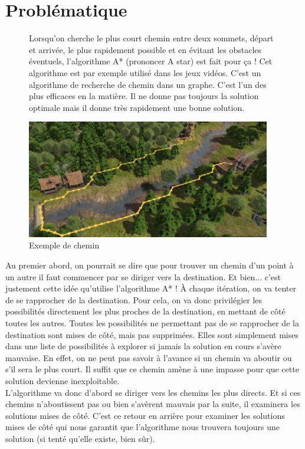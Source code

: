 

\section{Problématique}




\begin{figure}[!h]
\begin{minipage}{0.6\textwidth}
Lorsqu'on cherche le plus court chemin entre deux sommets, départ et arrivée, le plus rapidement possible et en évitant les obstacles éventuels, l'algorithme A* (prononcer A star) est fait pour ça ! Cet algorithme est par exemple utilisé dans les jeux vidéos.
C'est un algorithme de recherche de chemin dans un graphe. C'est l'un des plus efficaces en la matière. Il ne donne pas toujours la solution optimale mais il donne très rapidement une bonne solution.\\
\end{minipage}
\begin{minipage}{0.4\textwidth}
\begin{center}
\includegraphics[width=0.95\textwidth]{images/jeuVideo.jpg}
\caption{Exemple de chemin}
\end{center}
\end{minipage}
\end{figure}


Au premier abord, on pourrait se dire que pour trouver un chemin d'un point à un autre il faut commencer par se diriger vers la destination. Et bien... c'est justement cette idée qu'utilise l'algorithme A* ! À chaque itération, on va tenter de se rapprocher de la destination. Pour cela, on va donc privilégier les possibilités directement les plus proches de la destination, en mettant de côté toutes les autres. Toutes les possibilités ne permettant pas de se rapprocher de la destination sont mises de côté, mais pas supprimées. Elles
sont simplement mises dans une liste de possibilités à explorer si jamais la solution en cours s'avère mauvaise.
En effet, on ne peut pas savoir à l'avance si un chemin va aboutir ou s'il sera le plus court. Il suffit que ce chemin amène à une impasse pour que cette solution devienne inexploitable.\\
L'algorithme va donc d'abord se diriger vers les chemins les plus directs. Et si ces chemins n'aboutissent pas ou bien s'avèrent mauvais par la suite, il examinera les solutions mises de côté. C'est ce retour en arrière pour examiner les solutions mises de côté qui nous garantit que l'algorithme nous trouvera toujours une solution (si
tenté qu'elle existe, bien sûr).



